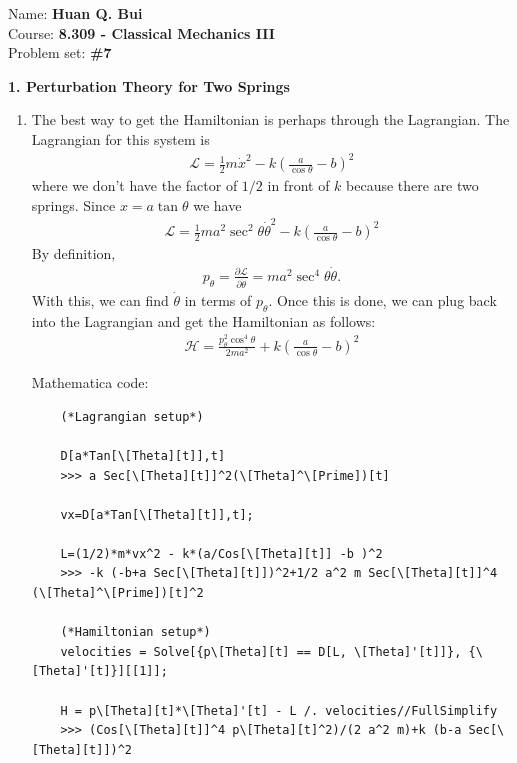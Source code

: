 \documentclass{article}
\theoremstyle{definition}
\newcommand{\p}{\partial}
\newcommand{\lag}{\mathcal{L}}
\newcommand{\ham}{\mathcal{H}}
\newcommand{\f}[2]{\frac{#1}{#2}}
\newcommand{\lp}{\left(}
\newcommand{\rp}{\right)}
\begin{document}
	
\begin{framed}
	\noindent Name: \textbf{Huan Q. Bui}\\
	Course: \textbf{8.309 - Classical Mechanics III}\\
	Problem set: \textbf{\#7}
\end{framed}



\noindent \textbf{1. Perturbation Theory for Two Springs}

\begin{enumerate}[label=(\alph*)]
	\item The best way to get the Hamiltonian is perhaps through the Lagrangian. The Lagrangian for this system is 
	\begin{align*}
	\lag = \f{1}{2}m \dot{x}^2 - k\lp \f{a}{\cos\theta}- b \rp ^2
	\end{align*}
	where we don't have the factor of $1/2$ in front of $k$ because there are two springs. Since $x = a\tan\theta$ we have
	\begin{align*}
	\lag = \f{1}{2}m a^2\sec^2\theta\dot\theta^2 - k\lp \f{a}{\cos\theta} - b\rp ^2
	\end{align*}
	By definition, 
	\begin{align*}
	p_\theta = \f{\p \lag}{\p \dot{\theta}} = ma^2\sec^4\theta \dot\theta.
	\end{align*}
	With this, we can find $\dot\theta$ in terms of $p_\theta$. Once this is done, we can plug back into the Lagrangian and get the Hamiltonian as follows:
	\begin{align*}
	\boxed{\ham = \f{p_\theta^2 \cos^4\theta}{2ma^2} + k\lp \f{a}{\cos\theta} -b \rp^2}
	\end{align*}
	
	Mathematica code:
	\begin{lstlisting}
	(*Lagrangian setup*)
	
	D[a*Tan[\[Theta][t]],t] 	
	>>> a Sec[\[Theta][t]]^2(\[Theta]^\[Prime])[t] 
	
	vx=D[a*Tan[\[Theta][t]],t]; 
	
	L=(1/2)*m*vx^2 - k*(a/Cos[\[Theta][t]] -b )^2 
	>>> -k (-b+a Sec[\[Theta][t]])^2+1/2 a^2 m Sec[\[Theta][t]]^4 (\[Theta]^\[Prime])[t]^2 
	
	(*Hamiltonian setup*)
	velocities = Solve[{p\[Theta][t] == D[L, \[Theta]'[t]]}, {\[Theta]'[t]}][[1]]; 
	
	H = p\[Theta][t]*\[Theta]'[t] - L /. velocities//FullSimplify 
	>>> (Cos[\[Theta][t]]^4 p\[Theta][t]^2)/(2 a^2 m)+k (b-a Sec[\[Theta][t]])^2 
	

\end{lstlisting}
\end{enumerate}
\end{document}
